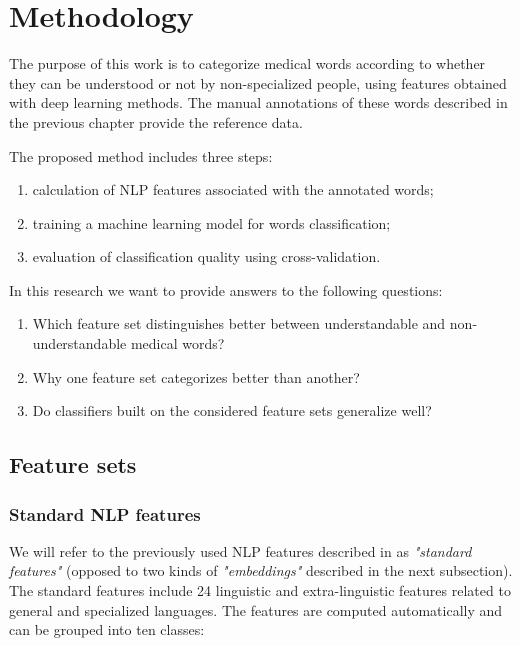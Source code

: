 \chapter{Methodology}
\label{ch:methodology}

The purpose of this work is to categorize medical words according to whether they can be understood or not by non-specialized people, using features obtained with deep learning methods. The manual annotations of these words described in the previous chapter provide the reference data. 


The proposed method includes three steps: 
\begin{enumerate}
    \item calculation of NLP features associated with the annotated words;
    \item training a machine learning model for words classification;
    \item evaluation of classification quality using cross-validation.
\end{enumerate}

In this research we want to provide answers to the following questions:
\begin{enumerate}
    \item Which feature set distinguishes better between understandable and non-understandable medical words?
    \item Why one feature set categorizes better than another?
    \item Do classifiers built on the considered feature sets generalize well? 
\end{enumerate}


\section{Feature sets}
\subsection{Standard NLP features}
\label{sec:standard-features}
We will refer to the previously used NLP features described in \citep{Grabar-PITR2014} as \textit{"standard features"} (opposed to two kinds of \textit{"embeddings"} described in the next subsection). The standard features include 24 linguistic and extra-linguistic features related to general and specialized languages. The features are computed automatically and can be grouped into ten classes: 

